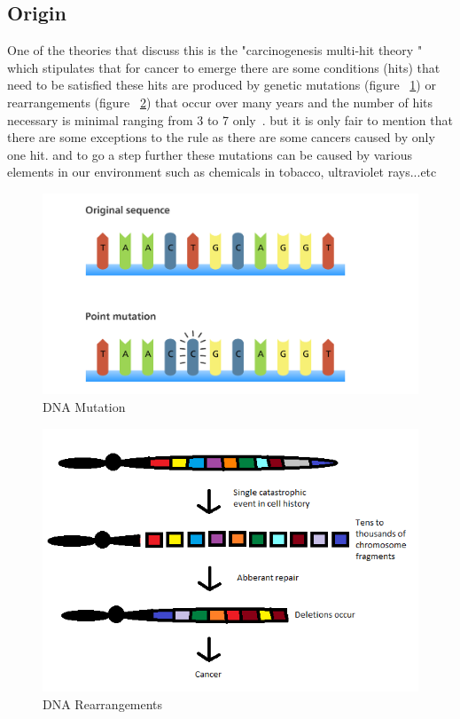 \subsection{Origin}
        One of the theories that discuss this is the "carcinogenesis multi-hit theory " which stipulates that for cancer to emerge there are some conditions (hits) that need to be satisfied these hits are produced by genetic mutations (figure ~\ref{fig:mutations}) or rearrangements (figure ~\ref{fig:reaarangement}) that occur over many years and the number of hits necessary is minimal ranging from 3 to 7 only~\cite{rachita2021}. but it is only fair to mention that there are some exceptions to the rule as there are some cancers caused by only one hit. and to go a step further these mutations can be caused by various elements in our environment such as chemicals in tobacco, ultraviolet rays...etc~\cite{whatiscancer2021}
\begin{figure}[htbp]
\begin{center}
\includegraphics[width=15cm]{./chapter-01-general-medical-information/mutation.png}
\end{center}
\caption{DNA Mutation ~\cite{mutations}}
\label{fig:mutations}
\end{figure}
\begin{figure}[htbp]
\begin{center}
\includegraphics[width=15cm]{./chapter-01-general-medical-information/dna-rearrangement.png}
\end{center}
\caption{DNA Rearrangements ~\cite{reaarangement}}
\label{fig:reaarangement}
\end{figure}
